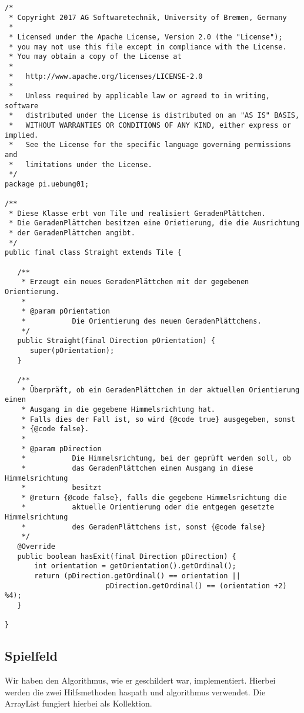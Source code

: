\documentclass{pi2}
\begin{document}
\begin{lstlisting}
/*
 * Copyright 2017 AG Softwaretechnik, University of Bremen, Germany
 *
 * Licensed under the Apache License, Version 2.0 (the "License");
 * you may not use this file except in compliance with the License.
 * You may obtain a copy of the License at
 *
 *   http://www.apache.org/licenses/LICENSE-2.0
 *
 *   Unless required by applicable law or agreed to in writing, software
 *   distributed under the License is distributed on an "AS IS" BASIS,
 *   WITHOUT WARRANTIES OR CONDITIONS OF ANY KIND, either express or implied.
 *   See the License for the specific language governing permissions and
 *   limitations under the License.
 */
package pi.uebung01;

/**
 * Diese Klasse erbt von Tile und realisiert GeradenPlättchen.
 * Die GeradenPlättchen besitzen eine Orietierung, die die Ausrichtung
 * der GeradenPlättchen angibt.
 */
public final class Straight extends Tile {

   /**
    * Erzeugt ein neues GeradenPlättchen mit der gegebenen Orientierung.
    *
    * @param pOrientation
    *           Die Orientierung des neuen GeradenPlättchens.
    */
   public Straight(final Direction pOrientation) {
      super(pOrientation);
   }
   
   /**
    * Überpräft, ob ein GeradenPlättchen in der aktuellen Orientierung einen
    * Ausgang in die gegebene Himmelsrichtung hat.
    * Falls dies der Fall ist, so wird {@code true} ausgegeben, sonst
    * {@code false}.
    * 
    * @param pDirection
    * 			Die Himmelsrichtung, bei der geprüft werden soll, ob
    * 			das GeradenPlättchen einen Ausgang in diese Himmelsrichtung
    * 			besitzt
    * @return {@code false}, falls die gegebene Himmelsrichtung die
    * 			aktuelle Orientierung oder die entgegen gesetzte Himmelsrichtung
    *  			des GeradenPlättchens ist, sonst {@code false}
    */
   @Override
   public boolean hasExit(final Direction pDirection) {
	   int orientation = getOrientation().getOrdinal();
	   return (pDirection.getOrdinal() == orientation ||
			   			pDirection.getOrdinal() == (orientation +2) %4);
   }

}

\end{lstlisting}

\subsection{Spielfeld}

Wir haben den Algorithmus, wie er geschildert war, implementiert. Hierbei werden die zwei Hilfsmethoden haspath und algorithmus verwendet. Die ArrayList fungiert hierbei als Kollektion.
\end{document}
